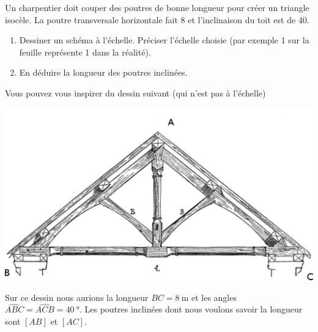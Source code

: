 
\begin{exercice}\label{exosmath-0824}

    Un charpentier doit couper des poutres de bonne longueur pour créer un triangle isocèle. La poutre transversale horizontale fait \unit{8}{\meter} et l'inclinaison du toit est de \unit{40}{\degree}. 
    \begin{enumerate}
        \item
            Dessiner un schéma à l'échelle. Préciser l'échelle choisie (par exemple \unit{1}{\centi\meter} sur la feuille représente \unit{1}{\meter} dans la réalité).
        \item
            En déduire la longueur des poutres inclinées.
    \end{enumerate}

    Vous pouvez vous inspirer du dessin suivant\cite{EKNooAsTWza} (qui n'est pas à l'échelle)
    \begin{center}
    \includegraphics[width=0.7\linewidth]{Charpenteetjambettes2.pdf}
    \end{center}
    Sur ce dessin nous aurions la longueur \( BC=\SI{8}{\meter}\) et les angles \( \widehat{ABC}=\widehat{ACB}=\SI{40}{\degree}\). Les poutres inclinées dont nous voulons savoir la longueur sont \( [AB]\) et \( [AC]\).
    
\end{exercice}
